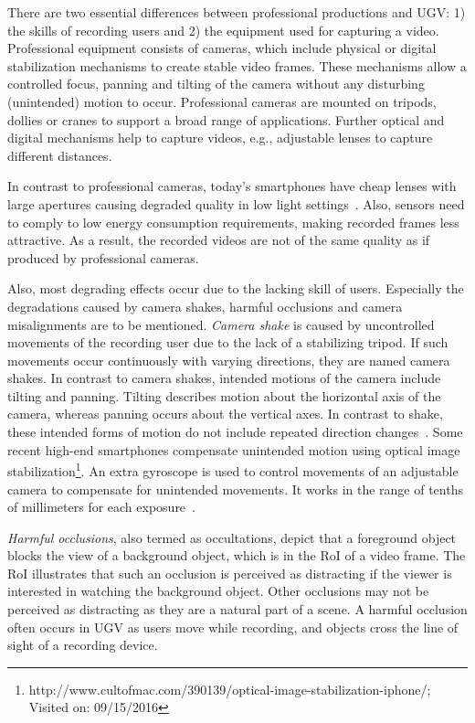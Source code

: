 There are two essential differences between professional productions and \ac{UGV}: 1) the skills of recording users and 2) the equipment used for capturing a video.
Professional equipment consists of cameras, which include physical or digital stabilization mechanisms to create stable video frames.
These mechanisms allow a controlled focus, panning and tilting of the camera without any disturbing (unintended) motion to occur.
Professional cameras are mounted on tripods, dollies or cranes to support a broad range of applications.
Further optical and digital mechanisms help to capture videos, e.g., adjustable lenses to capture different distances. 

In contrast to professional cameras, today's smartphones have cheap lenses with large apertures causing degraded quality in low light settings~\cite{Dialogic2009}.
Also, sensors need to comply to low energy consumption requirements, making recorded frames less attractive.
As a result, the recorded videos are not of the same quality as if produced by professional cameras. 

Also, most degrading effects occur due to the lacking skill of users.
Especially the degradations caused by camera shakes, harmful occlusions and camera misalignments are to be mentioned.
\emph{Camera shake} is caused by uncontrolled movements of the recording user due to the lack of a stabilizing tripod.
If such movements occur continuously with varying directions, they are named camera shakes.
In contrast to camera shakes, intended motions of the camera include tilting and panning.
Tilting describes motion about the horizontal axis of the camera, whereas panning occurs about the vertical axes.
In contrast to shake, these intended forms of motion do not include repeated direction changes~\cite{Ward2003}.
Some recent high-end smartphones compensate unintended motion using optical image stabilization\footnote{http://www.cultofmac.com/390139/optical-image-stabilization-iphone/; Visited on: 09/15/2016}.
An extra gyroscope is used to control movements of an adjustable camera to compensate for unintended movements. 
It works in the range of tenths of millimeters for each exposure~\cite{Karpenko2011,Shin2011}.

\emph{Harmful occlusions}, also termed as occultations, depict that a foreground object blocks the view of a background object, which is in the \ac{RoI} of a video frame.
The \ac{RoI} illustrates that such an occlusion is perceived as distracting if the viewer is interested in watching the background object.
Other occlusions may not be perceived as distracting as they are a natural part of a scene.
A harmful occlusion often occurs in \ac{UGV} as users move while recording, and objects cross the line of sight of a recording device.

